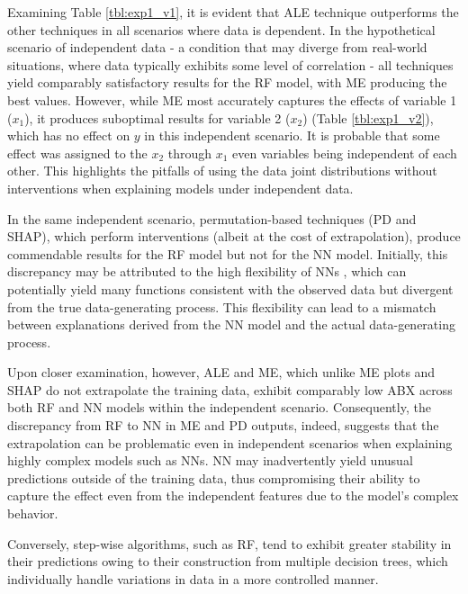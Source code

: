 Examining Table \ref{tbl:exp1_v1}, it is evident that \gls{ALE} technique outperforms the other techniques in all scenarios where data is dependent. In the hypothetical scenario of independent data - a condition that may diverge from real-world situations, where data typically exhibits some level of correlation - all techniques yield comparably satisfactory results for the RF model, with \gls{ME} producing the best values. However, while \gls{ME} most accurately captures the effects of variable 1 ($x_1$), it produces suboptimal results for variable 2 ($x_2$) (Table \ref{tbl:exp1_v2}), which has no effect on $y$ in this independent scenario. It is probable that some effect was assigned to the $x_2$ through $x_1$ even variables being independent of each other. This highlights the pitfalls of using the data joint distributions without interventions when explaining models under independent data.

In the same independent scenario, permutation-based techniques (\gls{PD} and \gls{SHAP}), which perform interventions (albeit at the cost of extrapolation), produce commendable results for the \gls{RF} model but not for the \gls{NN} model. Initially, this discrepancy may be attributed to the high flexibility of \gls{NN}s \cite{Grinsztajn2022WhyData}, which can potentially yield many functions consistent with the observed data but divergent from the true data-generating process. This flexibility can lead to a mismatch between explanations derived from the \gls{NN} model and the actual data-generating process. 

Upon closer examination, however, \gls{ALE} and \gls{ME}, which unlike \gls{ME} plots and \gls{SHAP} do not extrapolate the training data, exhibit comparably low \gls{ABX} across both \gls{RF} and \gls{NN} models within the independent scenario. Consequently, the discrepancy from \gls{RF} to \gls{NN} in \gls{ME} and \gls{PD} outputs, indeed, suggests that the extrapolation can be problematic even in independent scenarios when explaining highly complex models such as \gls{NN}s. \gls{NN} may inadvertently yield unusual predictions outside of the training data, thus compromising their ability to capture the effect even from the independent features due to the model's complex behavior.

Conversely, step-wise algorithms, such as RF, tend to exhibit greater stability in their predictions owing to their construction from multiple decision trees, which individually handle variations in data in a more controlled manner.

